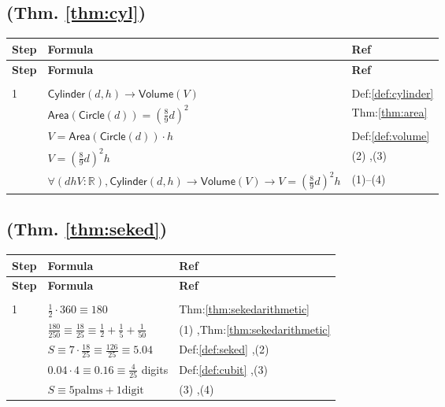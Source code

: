 \documentclass[12pt]{amsart}
\newcommand{\br}{,\allowbreak}
\newenvironment{prooftable}{%
	\renewcommand{\arraystretch}{1.2}%
	\setlength{\tabcolsep}{4pt}%
	\setlength{\arrayrulewidth}{0.05pt}
	\tiny
	\sloppy
	\begin{longtable}{
			|>{\centering\arraybackslash}m{0.7cm}|
			>{\raggedright\centering\arraybackslash}m{0.70\textwidth}|
			>{\centering\arraybackslash}m{3.5cm}|  %
		}%
		\hline
		\textbf{Step} & \centering\textbf{Formula} & \textbf{Ref} \\
		\hline
		\endfirsthead
		\hline
		\textbf{Step} & \centering\textbf{Formula} & \textbf{Ref} \\
		\hline
		\endhead
		\hline
		\multicolumn{3}{r}{\textit{Continued on next page}} \\
		\endfoot
		\hline
		\endlastfoot
	}{%
	\end{longtable}%
}
\begin{document}
\subsection{(Thm. \ref{thm:cyl})}
\begin{prooftable}
	1 & $\textsf{Cylinder}(d \br h) \to \textsf{Volume}(V)$ & Def:\ref{def:cylinder} \\[3pt]  \hline
	2 & $\textsf{Area}(\textsf{Circle}(d)) = \left(\frac{8}{9}d\right)^2$ & Thm:\ref{thm:area} \\[3pt]  \hline
	3 & $V = \textsf{Area}(\textsf{Circle}(d)) \cdot h$ & Def:\ref{def:volume} \\[3pt]  \hline
	4 & $V = \left(\frac{8}{9}d\right)^2 h$ & (2) \br (3) \\[3pt]  \hdashline
	& $\forall (d h V : \mathbb{R}) \br  \textsf{Cylinder}(d \br h) \to \textsf{Volume}(V) \to V = \left(\frac{8}{9}d\right)^2 h$ & (1)--(4)
\end{prooftable}
\subsection{(Thm. \ref{thm:seked})}
\begin{prooftable}
	1 & $\frac{1}{2}\cdot 360 \equiv 180$ & Thm:\ref{thm:sekedarithmetic} \\[3pt]  \hline
	2 & $\frac{180}{250} \equiv \frac{18}{25} \equiv \frac{1}{2}+\frac{1}{5}+\frac{1}{50}$ & (1) \br  Thm:\ref{thm:sekedarithmetic} \\[3pt]  \hline
	3 & $S \equiv 7 \cdot \frac{18}{25} \equiv \frac{126}{25} \equiv 5.04$ & Def:\ref{def:seked} \br  (2) \\[3pt]  \hline
	4 & $0.04 \cdot 4 \equiv 0.16 \equiv \frac{4}{25}$ digits & Def:\ref{def:cubit} \br  (3) \\[3pt]  \hdashline
	& $S \equiv 5\text{palms} + 1\text{digit}$ & (3) \br (4)
\end{prooftable}
\end{document}
